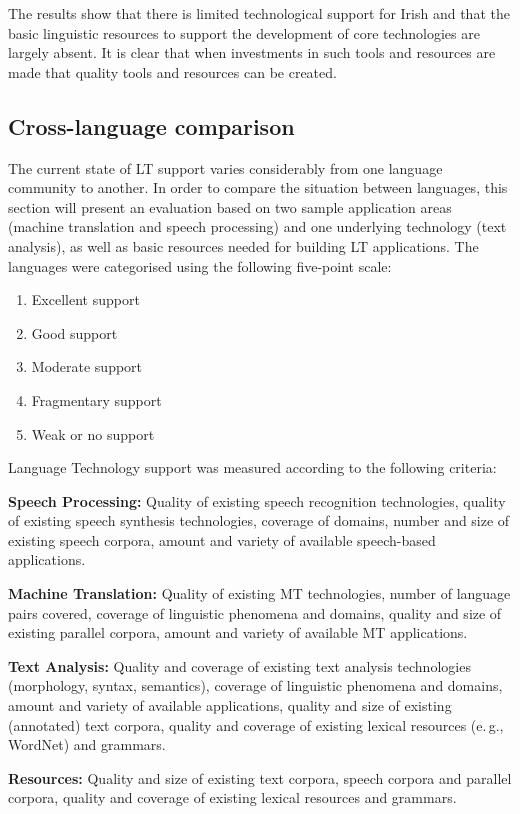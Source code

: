 \begin{multicols}{2}
The results show that there is limited technological support for Irish and that the basic linguistic resources to support the development of core technologies are largely absent. It is clear that when investments in such tools and resources are made that quality tools and resources can be created.

\subsection{Cross-language comparison}
The current state of LT support varies considerably from one language community to another. In order to compare the situation between languages, this section will present an evaluation based on two sample application areas (machine translation and speech processing) and one underlying technology (text analysis), as well as basic resources needed for building LT applications. The languages were categorised using the following five-point scale: 

\begin{enumerate}
\item Excellent support
\item Good support
\item Moderate support
\item Fragmentary support
\item Weak or no support
\end{enumerate}

Language Technology support was measured according to the following criteria:

\textbf{Speech Processing:} Quality of existing speech recognition technologies, quality of existing speech synthesis technologies, coverage of domains, number and size of existing speech corpora, amount and variety of available speech-based applications.

\textbf{Machine Translation:} Quality of existing MT technologies, number of language pairs covered, coverage of linguistic phenomena and domains, quality and size of existing parallel corpora, amount and variety of available MT applications.

\textbf{Text Analysis:} Quality and coverage of existing text analysis technologies (morphology, syntax, semantics), coverage of linguistic phenomena and domains, amount and variety of available applications, quality and size of existing (annotated) text corpora, quality and coverage of existing lexical resources (e.\,g., WordNet) and grammars.

\textbf{Resources:} Quality and size of existing text corpora, speech corpora and parallel corpora, quality and coverage of existing lexical resources and grammars.


\end{multicols}
